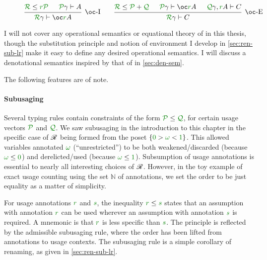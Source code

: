 \begin{figure}
\begin{displaymath}
\begin{matrix}
\begin{prooftree}
        \hypo{\grR \le \gr r\grP}
        \hypo{\grP\gamma \vdash A}
        \infer2[$\oc$-I]{\grR\gamma \vdash \oc\gr rA}
      \end{prooftree}
      &&
      \begin{prooftree}
        \hypo{\grR \le \grP + \grQ}
        \hypo{\grP\gamma \vdash \oc\gr rA}
        \hypo{\grQ\gamma, \gr rA \vdash C}
        \infer3[$\oc$-E]{\grR\gamma \vdash C}
      \end{prooftree}
    \end{matrix}
  \end{displaymath}
  \caption{\name{}}
  \label{fig:lr}
\end{figure}

I will not cover any operational semantics or equational theory of \name{} in
this thesis, though the substitution principle and notion of environment I
develop in \cref{sec:ren-sub-lr} make it easy to define any desired operational
semantics.
I will discuss a denotational semantics inspired by that of
\citet{AbelBernardy2020} in \cref{sec:den-sem}.

The following features are of note.

\paragraph{Subusaging}
Several typing rules contain constraints of the form $\grP \leq \grQ$, for
certain usage vectors $\grP$ and $\grQ$.
We saw subusaging in the introduction to this chapter in the specific case of
$\mathscr R$ being formed from the poset $\{\gr0 > \gr\omega < \gr1\}$.
This allowed variables annotated $\gr\omega$ (``unrestricted'') to be both
weakened/discarded (because $\gr\omega \leq \gr0$) and derelicted/used
(because $\gr\omega \leq \gr1$).
Subsumption of usage annotations is essential to nearly all interesting choices
of $\mathscr R$.
However, in the toy example of exact usage counting using the set $\mathbb N$ of
annotations, we set the order to be just equality as a matter of simplicity.

For usage annotations $\gr r$ and $\gr s$, the inequality $\gr r \leq \gr s$
states that an assumption with annotation $\gr r$ can be used wherever an
assumption with annotation $\gr s$ is required.
A mnemonic is that $\gr r$ is less specific than $\gr s$.
The principle is reflected by the admissible subusaging rule, where the order
has been lifted from annotations to usage contexts.
The subusaging rule is a simple corollary of renaming, as given in
\cref{sec:ren-sub-lr}.

